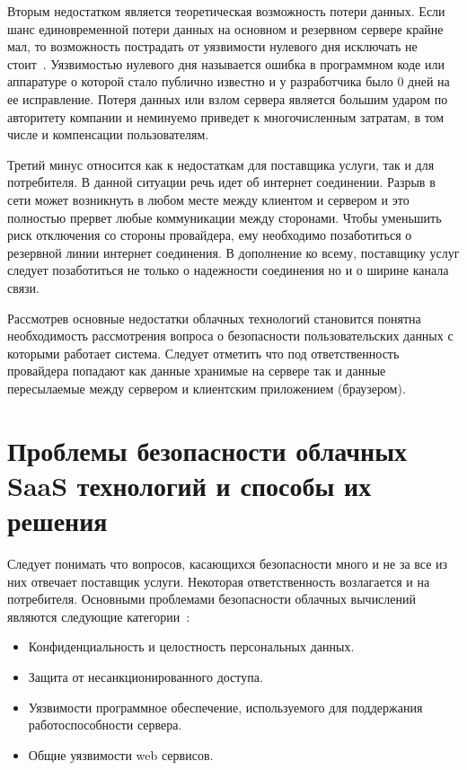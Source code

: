 Вторым недостатком является теоретическая возможность потери данных. Если шанс единовременной потери данных на основном и резервном сервере крайне мал, то возможность пострадать от уязвимости нулевого дня исключать не стоит~\cite{amoroso2013enterprise}. Уязвимостью нулевого дня называется ошибка в программном коде или аппаратуре о которой стало публично известно и у разработчика было 0 дней на ее исправление. Потеря данных или взлом сервера является большим ударом по авторитету компании и неминуемо приведет к многочисленным затратам, в том числе и  компенсации пользователям.

Третий минус относится как к недостаткам для поставщика услуги, так и для потребителя. В данной ситуации речь идет об интернет соединении. Разрыв в сети может возникнуть в любом месте между клиентом и сервером и это полностью прервет любые коммуникации между сторонами. Чтобы уменьшить риск отключения со стороны провайдера, ему необходимо позаботиться о резервной линии интернет соединения. В дополнение ко всему, поставщику услуг следует позаботиться не только о надежности соединения но и о ширине канала связи.

Рассмотрев основные недостатки облачных технологий становится понятна необходимость рассмотрения вопроса о безопасности пользовательских данных с которыми работает система. Следует отметить что под ответственность провайдера попадают как данные хранимые на сервере так и данные пересылаемые между сервером и клиентским приложением (браузером).

\section{Проблемы безопасности облачных SaaS технологий и способы их решения}

Следует понимать что вопросов, касающихся безопасности много и не за все из них отвечает поставщик услуги. Некоторая ответственность возлагается и на потребителя.
Основными проблемами безопасности облачных вычислений являются следующие категории~\cite{khalil2014cloud}:

\begin{itemize}
	\item Конфиденциальность и целостность персональных данных.
	\item Защита от несанкционированного доступа. 
	\item Уязвимости программное обеспечение, используемого для поддержания работоспособности сервера.
	\item Общие уязвимости web сервисов.
\end{itemize}

